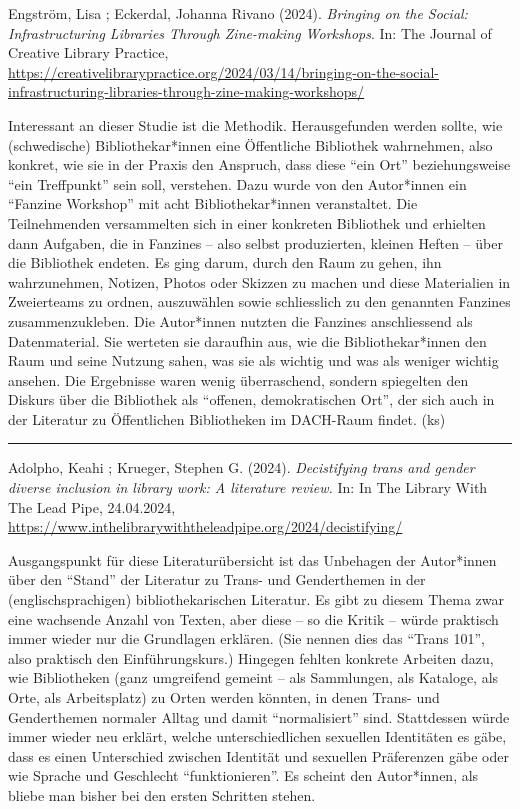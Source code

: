 \documentclass[a4paper,
fontsize=11pt,
oneside,
numbers=noperiodatend,
parskip=half-,
bibliography=totoc,
final
]{scrartcl}
\begin{document}
Engström, Lisa ; Eckerdal, Johanna Rivano (2024). \emph{Bringing on the
Social: Infrastructuring Libraries Through Zine-making Workshops}. In:
The Journal of Creative Library Practice,
\url{https://creativelibrarypractice.org/2024/03/14/bringing-on-the-social-infrastructuring-libraries-through-zine-making-workshops/}

Interessant an dieser Studie ist die Methodik. Herausgefunden werden
sollte, wie (schwedische) Bibliothekar*innen eine Öffentliche Bibliothek
wahrnehmen, also konkret, wie sie in der Praxis den Anspruch, dass diese
\enquote{ein Ort} beziehungsweise \enquote{ein Treffpunkt} sein soll,
verstehen. Dazu wurde von den Autor*innen ein \enquote{Fanzine Workshop}
mit acht Bibliothekar*innen veranstaltet. Die Teilnehmenden versammelten
sich in einer konkreten Bibliothek und erhielten dann Aufgaben, die in
Fanzines -- also selbst produzierten, kleinen Heften -- über die
Bibliothek endeten. Es ging darum, durch den Raum zu gehen, ihn
wahrzunehmen, Notizen, Photos oder Skizzen zu machen und diese
Materialien in Zweierteams zu ordnen, auszuwählen sowie schliesslich zu
den genannten Fanzines zusammenzukleben. Die Autor*innen nutzten die
Fanzines anschliessend als Datenmaterial. Sie werteten sie daraufhin
aus, wie die Bibliothekar*innen den Raum und seine Nutzung sahen, was
sie als wichtig und was als weniger wichtig ansehen. Die Ergebnisse
waren wenig überraschend, sondern spiegelten den Diskurs über die
Bibliothek als \enquote{offenen, demokratischen Ort}, der sich auch in
der Literatur zu Öffentlichen Bibliotheken im DACH-Raum findet. (ks)

\begin{center}\rule{0.5\linewidth}{0.5pt}\end{center}

Adolpho, Keahi ; Krueger, Stephen G. (2024). \emph{Decistifying trans
and gender diverse inclusion in library work: A literature review.} In:
In The Library With The Lead Pipe, 24.04.2024,
\url{https://www.inthelibrarywiththeleadpipe.org/2024/decistifying/}

Ausgangspunkt für diese Literaturübersicht ist das Unbehagen der
Autor*innen über den \linebreak \enquote{Stand} der Literatur zu Trans- und
Genderthemen in der (englischsprachigen) bibliothekarischen Literatur.
Es gibt zu diesem Thema zwar eine wachsende Anzahl von Texten, aber
diese -- so die Kritik -- würde praktisch immer wieder nur die
Grundlagen erklären. (Sie nennen dies das \enquote{Trans 101}, also
praktisch den Einführungskurs.) Hingegen fehlten konkrete Arbeiten dazu,
wie Bibliotheken (ganz umgreifend gemeint -- als Sammlungen, als
Kataloge, als Orte, als Arbeitsplatz) zu Orten werden könnten, in denen
Trans- und Genderthemen normaler Alltag und damit \enquote{normalisiert}
sind. Stattdessen würde immer wieder neu erklärt, welche
unterschiedlichen sexuellen Identitäten es gäbe, dass es einen
Unterschied zwischen Identität und sexuellen Präferenzen gäbe oder wie
Sprache und Geschlecht \enquote{funktionieren}. Es scheint den
Autor*innen, als bliebe man bisher bei den ersten Schritten stehen.
\end{document}
